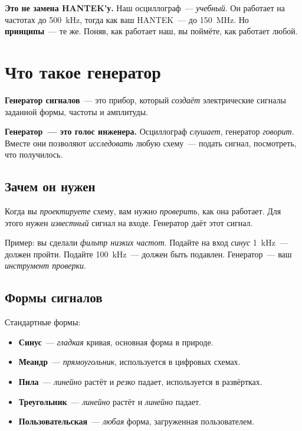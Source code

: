 \begin{notebox}
\textbf{Это не замена HANTEK'у.} Наш осциллограф~---
\emph{учебный}. Он работает на частотах до
\SI{500}{\kilo\hertz}, тогда как ваш HANTEK~--- до
\SI{150}{\mega\hertz}. Но \textbf{принципы}~--- те же.
Поняв, как работает наш, вы поймёте, как работает любой.
\end{notebox}

\section{Что такое генератор}
\label{sec:intro-generator}

\textbf{Генератор сигналов}~--- это прибор, который
\emph{создаёт} электрические сигналы заданной формы,
частоты и амплитуды.

\begin{keybox}
\textbf{Генератор~--- это голос инженера.} Осциллограф
\emph{слушает}, генератор \emph{говорит}. Вместе они
позволяют \emph{исследовать} любую схему~---
подать сигнал, посмотреть, что получилось.
\end{keybox}

\subsection{Зачем он нужен}

Когда вы \emph{проектируете} схему, вам нужно \emph{проверить},
как она работает. Для этого нужен \emph{известный} сигнал
на входе. Генератор даёт этот сигнал.

Пример: вы сделали \emph{фильтр низких частот}.
Подайте на вход \emph{синус} \SI{1}{\kilo\hertz}~---
должен пройти. Подайте \SI{100}{\kilo\hertz}~---
должен быть подавлен. Генератор~--- ваш \emph{инструмент
проверки}.

\subsection{Формы сигналов}

Стандартные формы:

\begin{itemize}
    \item \textbf{Синус}~--- \emph{гладкая} кривая, основная
          форма в природе.
    \item \textbf{Меандр}~--- \emph{прямоугольник},
          используется в цифровых схемах.
    \item \textbf{Пила}~--- \emph{линейно} растёт и
          \emph{резко} падает, используется в развёртках.
    \item \textbf{Треугольник}~--- \emph{линейно} растёт
          и \emph{линейно} падает.
    \item \textbf{Пользовательская}~--- \emph{любая} форма,
          загруженная пользователем.
\end{itemize}

